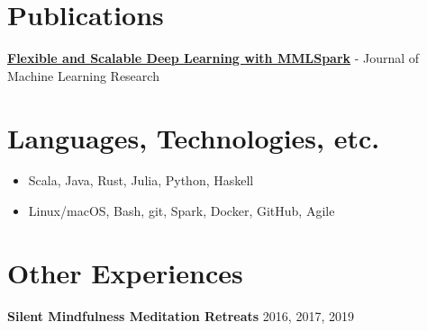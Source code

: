 \documentclass[overlapped]{res}
\begin{document}
\begin{resume}
    \section{Publications}
        {\bf \href{https://arxiv.org/pdf/1804.04031.pdf}{\underline{Flexible and Scalable Deep Learning with MMLSpark}}} - Journal of Machine Learning Research

    \section{Languages, Technologies, etc.}
    \begin{itemize} \itemsep-2pt
        \item
            Scala, Java, Rust, Julia, Python, Haskell
        \item
            Linux/macOS, Bash, git, Spark, Docker, GitHub, Agile
    \end{itemize}

    \section{Other Experiences}

    {\bf Silent Mindfulness Meditation Retreats} \hfill 2016, 2017, 2019

\end{resume}
\end{document}
